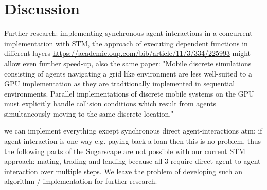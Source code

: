 \section{Discussion}
Further research: implementing synchronous agent-interactions in a concurrent implementation with STM, the approach of executing dependent functions in different layers \url{https://academic.oup.com/bib/article/11/3/334/225993} might allow even further speed-up, also the same paper: "Mobile discrete simulations consisting of agents navigating a grid like environment are less well-suited to a GPU implementation as they are traditionally implemented in sequential environments. Parallel implementations of discrete mobile systems on the GPU must explicitly handle collision conditions which result from agents simultaneously moving to the same discrete location."

we can implement everything except synchronous direct agent-interactions atm: if agent-interaction is one-way e.g. paying back a loan then this is no problem. thus the following parts of the Sugarscape are not possible with our current STM approach: mating, trading and lending  because all 3 require direct agent-to-agent interaction over multiple steps. We leave the problem of developing such an algorithm / implementation for further research.